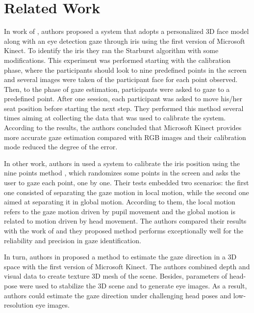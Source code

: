 \documentclass[10pt, conference]{IEEEtran}
\begin{document}
\section{Related Work} \label{sec:relatedWork}

	In work of \cite{7}, authors proposed a system that adopts a personalized 3D face model along with an eye detection gaze through iris using the first version of Microsoft Kinect. 
	To identify the iris they ran the Starburst algorithm \cite{8} with some modifications. 
	This experiment was performed starting with the calibration phase, where the participants should look to nine predefined points in the screen and several images were taken of the participant face for each point observed. 
	Then, to the phase of gaze estimation, participants were asked to gaze to a predefined point. 
	After one session, each participant was asked to move his/her seat position before starting the next step. 
	They performed this method several times aiming at collecting the data that was used to calibrate the system.
	According to the results, the authors concluded that Microsoft Kinect provides more accurate gaze estimation compared with RGB images and their calibration mode reduced the degree of the error.

	In other work, authors in \cite{8} used a system to calibrate the iris position using the nine points method \cite{9}, which randomizes some points in the screen and asks the user to gaze each point, one by one. 
	Their tests embedded two scenarios: the first one consisted of separating the gaze motion in local motion, while the second one aimed at separating it in global motion. 
	According to them, the local motion refers to the gaze motion driven by pupil movement and the global motion is related to motion driven by head movement. 
	The authors compared their results with the work of \cite{9}  and they proposed method performs exceptionally well for the reliability and precision in gaze identification.

	In turn, authors in \cite{10} proposed a method to estimate the gaze direction in a 3D space with the first version of Microsoft Kinect. 
	The authors combined depth and visual data to create texture 3D mesh of the scene. 
	Besides, parameters of head-pose were used to stabilize the 3D scene and to generate eye images. 
	As a result, authors could estimate the gaze direction under challenging head poses and low-resolution eye images.
\end{document}

